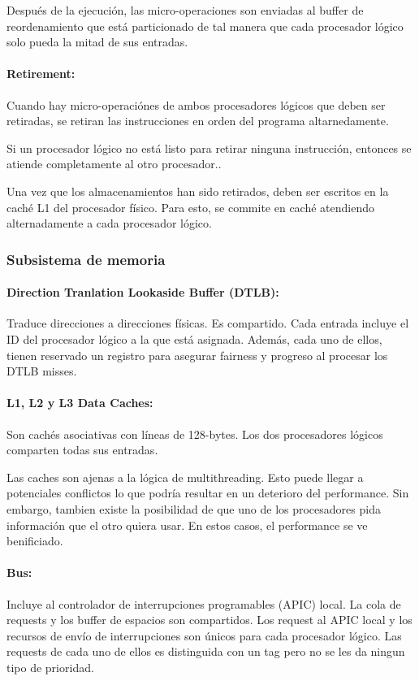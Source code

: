 Después de la ejecución, las micro-operaciones son enviadas al buffer de reordenamiento que está particionado de tal manera que cada procesador lógico solo pueda la mitad de sus entradas.

\paragraph{Retirement:} Cuando hay micro-operaciónes de ambos procesadores lógicos que deben ser retiradas, se  retiran las instrucciones en orden del programa altarnedamente.

Si un procesador lógico no está listo para retirar ninguna instrucción, entonces se atiende completamente al otro procesador..

Una vez que los almacenamientos han sido retirados, deben ser escritos en la caché L1 del procesador físico. Para esto, se commite en caché atendiendo alternadamente a cada procesador lógico.

\subsubsection{Subsistema de memoria}

\paragraph{Direction Tranlation Lookaside Buffer (DTLB):} Traduce direcciones a direcciones físicas. Es compartido. Cada entrada incluye el ID del procesador lógico a la que está asignada. Además, cada uno de ellos, tienen reservado un registro para asegurar fairness y progreso al procesar los DTLB misses.

\paragraph{L1, L2 y L3 Data Caches:}
Son cachés asociativas con líneas de 128-bytes. Los dos procesadores lógicos comparten todas sus entradas.

Las caches son ajenas a la lógica de multithreading. Esto puede llegar a potenciales conflictos lo que podría resultar en un deterioro del performance. Sin embargo, tambien existe la posibilidad de que uno de los procesadores pida información que el otro quiera usar. En estos casos, el performance se ve benificiado.

\paragraph{Bus:} Incluye al controlador de interrupciones programables (APIC) local.
La cola de requests y los buffer de espacios son compartidos. Los request al APIC local y los recursos de envío de interrupciones son únicos para cada procesador lógico. Las requests de cada uno de ellos es distinguida con un tag pero no se les da ningun tipo de prioridad.

